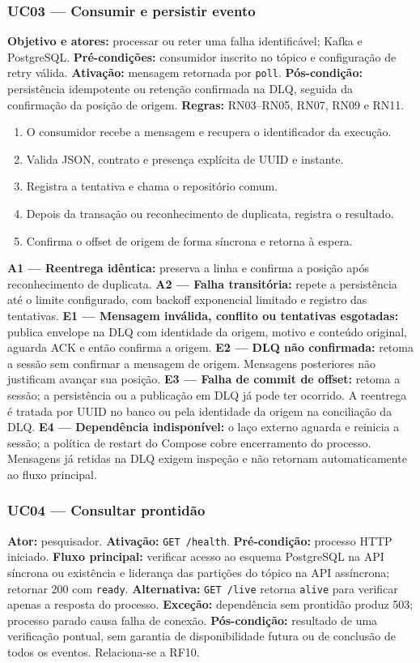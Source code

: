 \subsubsection{UC03 --- Consumir e persistir evento}
\textbf{Objetivo e atores:} processar ou reter uma falha identificável; Kafka e PostgreSQL.
\textbf{Pré-condições:} consumidor inscrito no tópico e configuração de retry válida.
\textbf{Ativação:} mensagem retornada por \texttt{poll}.
\textbf{Pós-condição:} persistência idempotente ou retenção confirmada na DLQ, seguida da confirmação da posição de origem.
\textbf{Regras:} RN03--RN05, RN07, RN09 e RN11.
\begin{enumerate}
\item O consumidor recebe a mensagem e recupera o identificador da execução.
\item Valida JSON, contrato e presença explícita de UUID e instante.
\item Registra a tentativa e chama o repositório comum.
\item Depois da transação ou reconhecimento de duplicata, registra o resultado.
\item Confirma o offset de origem de forma síncrona e retorna à espera.
\end{enumerate}
\textbf{A1 --- Reentrega idêntica:} preserva a linha e confirma a posição após reconhecimento de duplicata.
\textbf{A2 --- Falha transitória:} repete a persistência até o limite configurado, com backoff exponencial limitado e registro das tentativas.
\textbf{E1 --- Mensagem inválida, conflito ou tentativas esgotadas:} publica envelope na DLQ com identidade da origem, motivo e conteúdo original, aguarda ACK e então confirma a origem.
\textbf{E2 --- DLQ não confirmada:} retoma a sessão sem confirmar a mensagem de origem. Mensagens posteriores não justificam avançar sua posição.
\textbf{E3 --- Falha de commit de offset:} retoma a sessão; a persistência ou a publicação em DLQ já pode ter ocorrido. A reentrega é tratada por UUID no banco ou pela identidade da origem na conciliação da DLQ.
\textbf{E4 --- Dependência indisponível:} o laço externo aguarda e reinicia a sessão; a política de restart do Compose cobre encerramento do processo. Mensagens já retidas na DLQ exigem inspeção e não retornam automaticamente ao fluxo principal.

\subsubsection{UC04 --- Consultar prontidão}
\textbf{Ator:} pesquisador.
\textbf{Ativação:} \texttt{GET /health}.
\textbf{Pré-condição:} processo HTTP iniciado.
\textbf{Fluxo principal:} verificar acesso ao esquema PostgreSQL na API síncrona ou existência e liderança das partições do tópico na API assíncrona; retornar 200 com \texttt{ready}.
\textbf{Alternativa:} \texttt{GET /live} retorna \texttt{alive} para verificar apenas a resposta do processo.
\textbf{Exceção:} dependência sem prontidão produz 503; processo parado causa falha de conexão.
\textbf{Pós-condição:} resultado de uma verificação pontual, sem garantia de disponibilidade futura ou de conclusão de todos os eventos. Relaciona-se a RF10.

